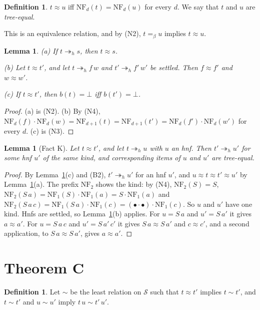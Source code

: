 \documentclass[11pt]{amsart}
\newtheorem{lemma}[theorem]{Lemma}
\theoremstyle{definition}
\newtheorem{definition}[theorem]{Definition}
\newcommand{\Ter}{\mathcal S}
\newcommand{\hred}{\twoheadrightarrow_h}
\newcommand{\conv}{=_\beta}
\newcommand{\hole}{\bullet}
\newcommand{\NF}{\mathrm{NF}}
\newcommand{\cg}{\sim}
\begin{document}
\begin{definition}\label{def:eqv}
$t\approx u$ iff $\NF_d(t)=\NF_d(u)$ for every $d$. We say that $t$ and $u$ are \emph{tree-equal}.
\end{definition}

This is an equivalence relation, and by (N2), $t\conv u$ implies $t\approx u$.

\begin{lemma}\label{lem:parts}
\textup{(a)} If $t\hred s$, then $t\approx s$.

\textup{(b)} Let $t\approx t'$, and let $t\hred f\,w$ and $t'\hred f'\,w'$ be settled. Then $f\approx f'$
and $w\approx w'$.

\textup{(c)} If $t\approx t'$, then $b(t)=\bot$ iff $b(t')=\bot$.
\end{lemma}

\begin{proof}
(a) is (N2). (b) By (N4), $\NF_d(f)\cdot\NF_d(w)=\NF_{d+1}(t)=\NF_{d+1}(t')=\NF_d(f')\cdot\NF_d(w')$ for
every $d$. (c) is (N3).
\end{proof}

\begin{lemma}[Fact K]\label{lem:K}
Let $t\approx t'$, and let $t\hred u$ with $u$ an hnf. Then $t'\hred u'$ for some hnf $u'$ of the
same kind, and corresponding items of $u$ and $u'$ are tree-equal.
\end{lemma}

\begin{proof}
By Lemma~\ref{lem:parts}(c) and (B2), $t'\hred u'$ for an hnf $u'$, and $u\approx t\approx t'\approx u'$
by Lemma~\ref{lem:parts}(a). The prefix $\NF_2$ shows the kind: by (N4), $\NF_2(S)=S$,
$\NF_2(S\,a)=\NF_1(S)\cdot\NF_1(a)=S\cdot\NF_1(a)$ and
$\NF_2(S\,a\,c)=\NF_1(S\,a)\cdot\NF_1(c)=(\hole\cdot\hole)\cdot\NF_1(c)$. So $u$ and $u'$ have one kind.
Hnfs are settled, so Lemma~\ref{lem:parts}(b) applies. For $u=S\,a$ and $u'=S\,a'$ it gives
$a\approx a'$. For $u=S\,a\,c$ and $u'=S\,a'\,c'$ it gives $S\,a\approx S\,a'$ and $c\approx c'$, and a
second application, to $S\,a\approx S\,a'$, gives $a\approx a'$.
\end{proof}

\section{Theorem C}\label{sec:C}

\begin{definition}\label{def:cong}
Let $\cg$ be the least relation on $\Ter$ such that $t\approx t'$ implies $t\cg t'$, and $t\cg t'$
and $u\cg u'$ imply $t\,u\cg t'\,u'$.
\end{definition}
\end{document}
